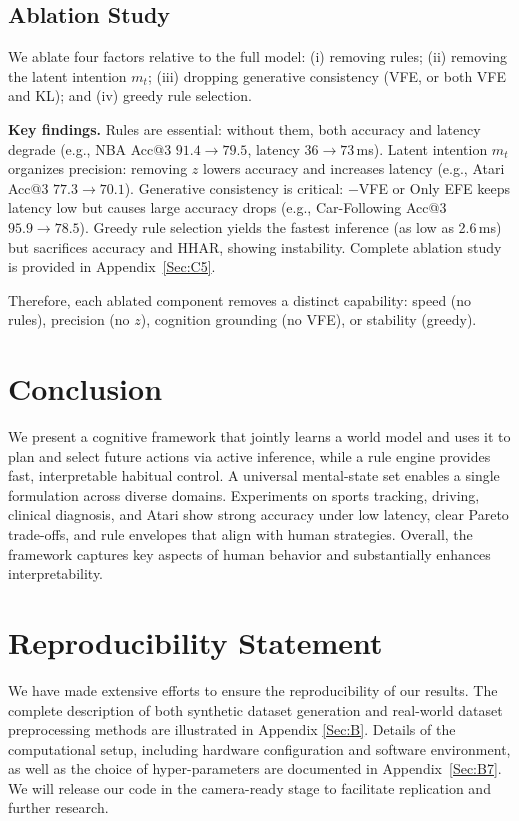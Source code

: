 \documentclass{article} %
\begin{document}
\subsection{Ablation Study}
We ablate four factors relative to the full model: (i) removing rules; 
(ii) removing the latent intention $m_t$; (iii) dropping generative consistency (VFE, or both VFE and KL); and (iv) greedy rule selection.

\textbf{Key findings.}  
Rules are essential: without them, both accuracy and latency degrade 
(e.g., NBA Acc@3 $91.4\!\to\!79.5$, latency $36\!\to\!73$\,ms).  
Latent intention $m_t$ organizes precision: removing $z$ lowers accuracy and increases latency (e.g., Atari Acc@3 $77.3\!\to\!70.1$).  
Generative consistency is critical: $-$VFE or Only EFE keeps latency low but causes large accuracy drops (e.g., Car-Following Acc@3 $95.9\!\to\!78.5$).  Greedy rule selection yields the fastest inference (as low as 2.6\,ms) but sacrifices accuracy and HHAR, showing instability. Complete ablation study is provided in Appendix~\ref{Sec:C5}.

Therefore, each ablated component removes a distinct capability: speed (no rules), precision (no $z$), cognition grounding (no VFE), or stability (greedy).

\section{Conclusion}
\label{sec:conclusion}
\vspace{-5pt}
We present a cognitive framework that jointly learns a world model and uses it to plan and select future actions via active inference, while a rule engine provides fast, interpretable habitual control. A universal mental-state set enables a single formulation across diverse domains. Experiments on sports tracking, driving, clinical diagnosis, and Atari show strong accuracy under low latency, clear Pareto trade-offs, and rule envelopes that align with human strategies. Overall, the framework captures key aspects of human behavior and substantially enhances interpretability.

\clearpage

\section*{Reproducibility Statement} We have made extensive efforts to ensure the reproducibility of our results. The complete description of both synthetic dataset generation and real-world dataset preprocessing methods are illustrated in Appendix \ref{Sec:B}. Details of the computational setup, including hardware configuration and software environment, as well as the choice of hyper-parameters are documented in Appendix~\ref{Sec:B7}. We will release our code in the camera-ready stage to facilitate replication and further research.
\end{document}
